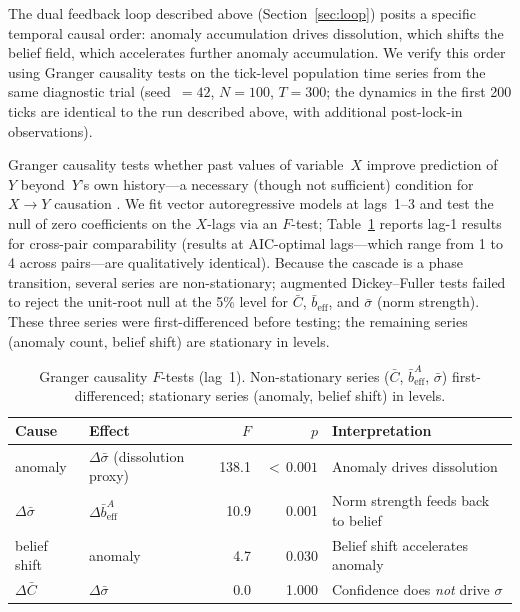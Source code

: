 \documentclass[11pt,a4paper]{article}
\begin{document}
The dual feedback loop described above (Section~\ref{sec:loop}) posits a specific temporal causal order: anomaly accumulation drives dissolution, which shifts the belief field, which accelerates further anomaly accumulation. We verify this order using Granger causality tests on the tick-level population time series from the same diagnostic trial (seed~$= 42$, $N = 100$, $T = 300$; the dynamics in the first 200 ticks are identical to the run described above, with additional post-lock-in observations).

Granger causality tests whether past values of variable~$X$ improve prediction of~$Y$ beyond~$Y$'s own history---a necessary (though not sufficient) condition for $X \to Y$ causation \citep{granger1969investigating}. We fit vector autoregressive models at lags~1--3 and test the null of zero coefficients on the $X$-lags via an $F$-test; Table~\ref{tab:granger} reports lag-1 results for cross-pair comparability (results at AIC-optimal lags---which range from 1 to 4 across pairs---are qualitatively identical). Because the cascade is a phase transition, several series are non-stationary; augmented Dickey--Fuller tests failed to reject the unit-root null at the 5\% level for $\bar{C}$, $\bar{b}_{\mathrm{eff}}$, and $\bar{\sigma}$ (norm strength). These three series were first-differenced before testing; the remaining series (anomaly count, belief shift) are stationary in levels.

\begin{table}[H]
\centering
\caption{Granger causality $F$-tests (lag~1). Non-stationary series ($\bar{C}$, $\bar{b}_{\mathrm{eff}}^A$, $\bar{\sigma}$) first-differenced; stationary series (anomaly, belief shift) in levels.}
\label{tab:granger}
\begin{tabular}{@{}llrrl@{}}
\toprule
Cause & Effect & $F$ & $p$ & Interpretation \\
\midrule
anomaly & $\Delta\bar{\sigma}$ (dissolution proxy) & 138.1 & ${<}\,0.001$ & Anomaly drives dissolution \\
$\Delta\bar{\sigma}$ & $\Delta\bar{b}_{\mathrm{eff}}^A$ & 10.9 & 0.001 & Norm strength feeds back to belief \\
belief shift & anomaly & 4.7 & 0.030 & Belief shift accelerates anomaly \\
$\Delta\bar{C}$ & $\Delta\bar{\sigma}$ & 0.0 & 1.000 & Confidence does \emph{not} drive $\sigma$ \\
\bottomrule
\end{tabular}
\end{table}
\end{document}
